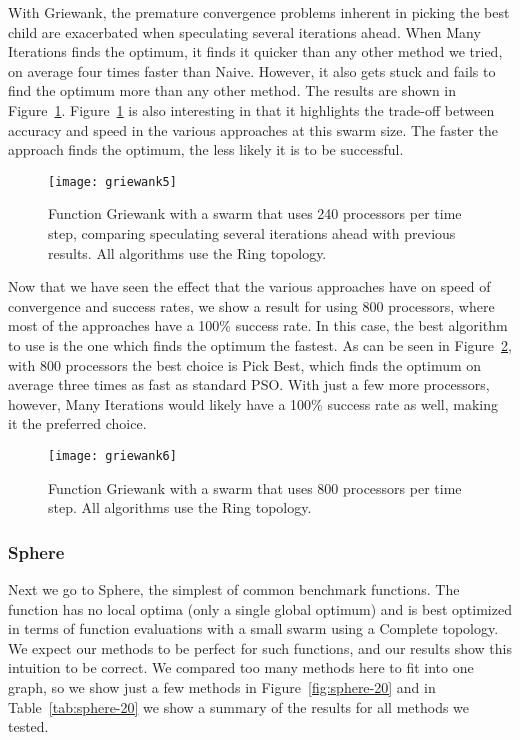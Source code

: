 \documentclass[smallcondensed]{svjour3}
\newcommand{\fig}[1]{Figure~\ref{fig:#1}}
\newcommand{\tabref}[1]{Table~\ref{tab:#1}}
\begin{document}
With Griewank, the premature convergence problems inherent in picking the best
child are exacerbated when speculating several iterations ahead.  When Many
Iterations finds the optimum, it finds it quicker than any other method we
tried, on average four times faster than Naive.  However, it also gets stuck
and fails to find the optimum more than any other method.  The results are
shown in \fig{griewank-manyiters}.   \fig{griewank-manyiters} is also
interesting in that it highlights the trade-off between accuracy and speed in
the various approaches at this swarm size.  The faster the approach finds the
optimum, the less likely it is to be successful.

\begin{figure}
  \centering
  \texttt{[image: griewank5]}
  \caption{Function Griewank with a swarm that uses 240 processors per time
  step, comparing speculating several iterations ahead with previous results.
  All algorithms use the Ring topology.}
  \label{fig:griewank-manyiters}
\end{figure}

Now that we have seen the effect that the various approaches have on speed of
convergence and success rates, we show a result for using 800 processors, where
most of the approaches have a 100\% success rate.  In this case, the best
algorithm to use is the one which finds the optimum the fastest.  As can be
seen in \fig{griewank-800}, with 800 processors the best choice is Pick Best,
which finds the optimum on average three times as fast as standard PSO.  With
just a few more processors, however, Many Iterations would likely have a 100\%
success rate as well, making it the preferred choice.

\begin{figure}
  \centering
  \texttt{[image: griewank6]}
  \caption{Function Griewank with a swarm that uses 800 processors per time
  step.  All algorithms use the Ring topology.}
  \label{fig:griewank-800}
\end{figure}

\subsubsection{Sphere}

Next we go to Sphere, the simplest of common benchmark functions.  The function
has no local optima (only a single global optimum) and is best optimized in
terms of function evaluations with a small swarm using a Complete topology.  We
expect our methods to be perfect for such functions, and our results show this
intuition to be correct.  We compared too many methods here to fit into one
graph, so we show just a few methods in \fig{sphere-20} and in
\tabref{sphere-20} we show a summary of the results for all methods we tested.
\end{document}
